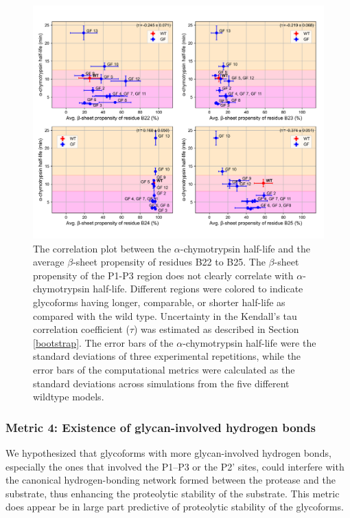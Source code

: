 \documentclass[sn-vancouver]{sn-jnl}
\begin{document}
\begin{figure}[H]
\centering
\includegraphics[width=\textwidth]{Figures/avg_beta_propensity_correlation.png}
\caption{The correlation plot between the $\alpha$-chymotrypsin half-life and the average $\beta$-sheet propensity of residues B22 to B25. The $\beta$-sheet propensity of the P1-P3 region does not clearly correlate with $\alpha$-chymotrypsin half-life. Different regions were colored to indicate glycoforms having longer, comparable, or shorter half-life as compared with the wild type. Uncertainty in the Kendall's tau correlation coefficient ($\tau$) was estimated as described in Section \ref{bootstrap}. The error bars of the $\alpha$-chymotrypsin half-life were the standard deviations of three experimental repetitions, while the error bars of the computational metrics were calculated as the standard deviations across simulations from the five different wildtype models.}
\label{result_beta}
\end{figure}

\subsubsection*{Metric 4: Existence of glycan-involved hydrogen bonds}
We hypothesized that glycoforms with more glycan-involved hydrogen bonds, especially the ones that involved the P1--P3 or the P2' sites, could interfere with the canonical hydrogen-bonding network formed between the protease and the substrate, thus enhancing the proteolytic stability of the substrate. This metric does appear be in large part predictive of proteolytic stability of the glycoforms. 
\end{document}
